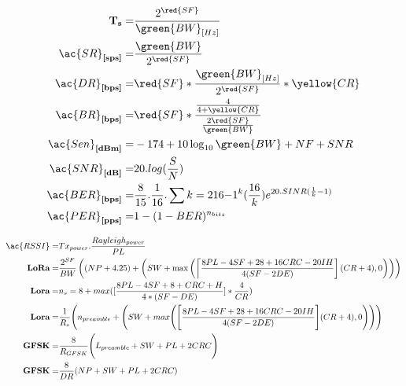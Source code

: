 \begin{align}
\textbf{T}_{\textbf{s}}=     & \frac{2^{\red{SF}}}{\green{BW}_{[Hz]}}\\
\ac{SR}_{\textbf{[sps]}}=    & \frac{\green{BW}}{2^{\red{SF}}}\\
\ac{DR}_{\textbf{[bps]}}    =& \red{SF}*\frac{\green{BW}_{[Hz]}}{2^{\red{SF}}}*\yellow{CR}\\
\ac{BR}_{\textbf{[bps]}}    =& \red{SF} * \frac{\frac{4}{4+\yellow{CR}}}{\frac{2 \red{SF}}{\green{BW}}}\\
\ac{Sen}_{\textbf{[dBm]}} =  & -174+10 \log _{10} \green{BW} + NF + SNR\\
\ac{SNR}_{\textbf{[dB]}} =   & 20.log(\frac{S}{N})\\
\ac{BER}_{\textbf{[bps]}} =  & \frac{8}{15}.\frac{1}{16}.\sum{k=2}{16}{-1^{k}(\frac{16}{k})e^{20.SINR(\frac{1}{k}-1)}}\\
\ac{PER}_{\textbf{[pps]}}=   & 1-(1-BER)^{n_{bits}}\\
\end{align}



\begin{align}
\ac{RSSI} = & Tx_{power}.\frac{Rayleigh_{power}}{PL}\\
\textbf{LoRa}=                                       & \frac{2^{S F}}{B W}\left((N P+4.25)+\left(S W+\max \left(\left\lceil\frac{8 P L-4 S F+28+16 C R C-20 I H}{4(S F-2 D E)}\right](C R+4), 0\right)\right)\right)\\
\textbf{Lora}=                                       & n_{s}=8+max([\frac{8PL-4SF+8+CRC+H}{4*(SF-DE)}]*\frac{4}{CR})\\
\textbf{Lora}=                                       & \frac{1}{R_{s}} \Bigg(n_{preamble} + \Bigg(SW + max\Bigg(\Bigg[\frac{8PL - 4SF + 28 + 16CRC -20IH}{4(SF-2DE)}\Bigg](CR+4),0\Bigg)\Bigg)\Bigg)\\
\textbf{GFSK}=                                       & \frac{8}{R_{GFSK}}\Bigg(L_{preamble} + SW + PL + 2CRC\Bigg)\\
\textbf{GFSK}=                                       & \frac{8}{D R}(N P+S W+P L+2 C R C)\\
\end{align}




